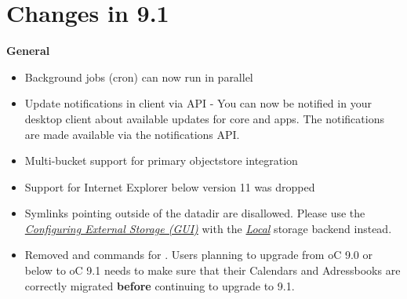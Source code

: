 \documentclass[letterpaper,10pt,english]{sphinxmanual}
\begin{document}
\section{Changes in 9.1}
\label{release_notes:changes-in-9-1}
\textbf{General}
\begin{itemize}
\item {} 
Background jobs (cron) can now run in parallel

\item {} 
Update notifications in client via API - You can now be notified in your desktop client
about available updates for core and apps. The notifications are made available via the
notifications API.

\item {} 
Multi-bucket support for primary objectstore integration

\item {} 
Support for Internet Explorer below version 11 was dropped

\item {} 
Symlinks pointing outside of the datadir are disallowed. Please use the {\hyperref[configuration_files/external_storage_configuration_gui::doc]{\emph{Configuring External Storage (GUI)}}}
with the {\hyperref[configuration_files/external_storage/local::doc]{\emph{Local}}} storage backend instead.

\item {} 
Removed  and  commands for .
Users planning to upgrade from oC 9.0 or below to oC 9.1 needs to make sure that their
Calendars and Adressbooks are correctly migrated \textbf{before} continuing to upgrade to 9.1.

\end{itemize}
\end{document}
